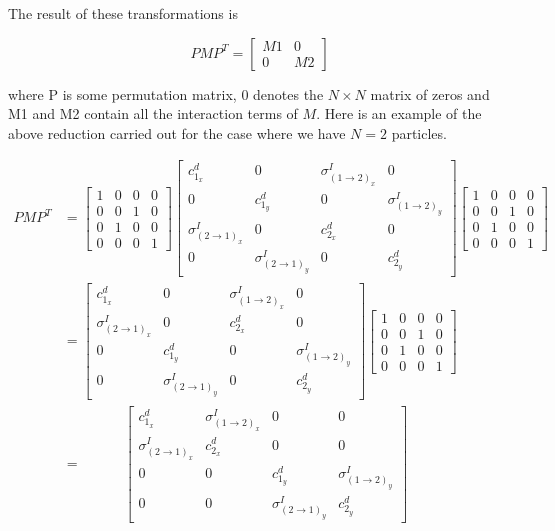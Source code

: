\documentclass[paper=a4, fontsize=12pt]{scrartcl} %
\numberwithin{equation}{section}       %
\numberwithin{figure}{section}         %
\numberwithin{table}{section}          %
\begin{document}
\indent The result of these transformations is 

$$ 
PMP^T = 
\begin{bmatrix}
M1 & 0 \\ 
0 & M2 
\end{bmatrix}
$$

\noindent where P is some permutation matrix, 0 denotes the $N\times N$ matrix of zeros and M1 and M2 contain all the interaction terms of $M$. Here is an example of the above reduction carried out for the case where we have $N=2$ particles. 

\begin{align*}
PMP^T &= 
	\left[ \begin{matrix}
	1 & 0 & 0 & 0 \\
	0 & 0 & 1 & 0 \\ 
	0 & 1 & 0 & 0 \\ 
	0 & 0 & 0 & 1 
	\end{matrix} \right] 
	\left[ \begin{matrix}
	c^d_{1_{x}} & 0 & \sigma^I_{(1\rightarrow 2)_{x}} & 0 \\
	0 			& c^d_{1_{y}} & 0 & \sigma^I_{(1\rightarrow 2)_{y}} \\
	\sigma^I_{(2\rightarrow 1)_{x}} & 0 & c^d_{2_{x}} & 0 \\
	0 & \sigma^I_{(2\rightarrow 1)_{y}} & 0 & c^d_{2_{y}} 
	\end{matrix} \right]
	\left[ \begin{matrix}
	1 & 0 & 0 & 0 \\
	0 & 0 & 1 & 0 \\ 
	0 & 1 & 0 & 0 \\ 
	0 & 0 & 0 & 1 
	\end{matrix} \right]
\\
&=
	\left[ \begin{matrix}
	c^d_{1_{x}} & 0 & \sigma^I_{(1\rightarrow 2)_{x}} & 0 \\
	\sigma^I_{(2\rightarrow 1)_{x}} & 0 & c^d_{2_{x}} & 0 \\
	0 & c^d_{1_{y}} & 0 & \sigma^I_{(1\rightarrow 2)_{y}} \\
	0 & \sigma^I_{(2\rightarrow 1)_{y}} & 0 & c^d_{2_{y}} 
	\end{matrix} \right]
	\left[ \begin{matrix}
	1 & 0 & 0 & 0 \\
	0 & 0 & 1 & 0 \\ 
	0 & 1 & 0 & 0 \\ 
	0 & 0 & 0 & 1 
	\end{matrix} \right]
\\
&= \quad \quad \quad
	\left[ \begin{matrix}
	c^d_{1_{x}} & \sigma^I_{(1\rightarrow 2)_{x}} & 0 & 0 \\
	\sigma^I_{(2\rightarrow 1)_{x}} & c^d_{2_{x}} & 0 & 0 \\
	0 & 0 & c^d_{1_{y}} & \sigma^I_{(1\rightarrow 2)_{y}} \\
	0 & 0 &  \sigma^I_{(2\rightarrow 1)_{y}}  & c^d_{2_{y}} 
	\end{matrix} \right]
\\
\end{align*} 
\end{document}
